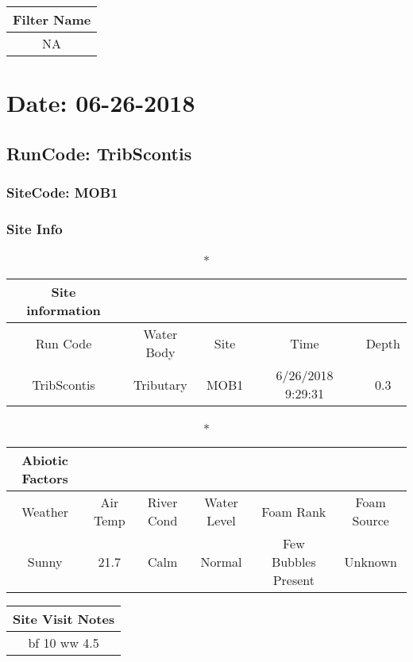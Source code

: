 \documentclass[
  letterpaper,
  DIV=11,
  numbers=noendperiod]{scrartcl}
\begin{document}
\begin{longtable*}{c}
\toprule
Filter Name \\ 
\midrule\addlinespace[2.5pt]
NA \\ 
\bottomrule
\end{longtable*}

\hypertarget{date-06-26-2018-8}{%
\section{Date: 06-26-2018}\label{date-06-26-2018-8}}

\hypertarget{runcode-tribscontis-8}{%
\subsection{RunCode: TribScontis}\label{runcode-tribscontis-8}}

\hypertarget{sitecode-mob1}{%
\subsubsection{SiteCode: MOB1}\label{sitecode-mob1}}

\subsubsection{Site Info}

\begin{longtable*}{ccccc}
\caption*{
{\large Site information}
} \\ 
\toprule
Run Code & Water Body & Site & Time & Depth \\ 
\midrule\addlinespace[2.5pt]
TribScontis & Tributary & MOB1 & 6/26/2018 9:29:31 & 0.3 \\ 
\bottomrule
\end{longtable*}

\begin{longtable*}{cccccc}
\caption*{
{\large Abiotic Factors}
} \\ 
\toprule
Weather & Air Temp & River Cond & Water Level & Foam Rank & Foam Source \\ 
\midrule\addlinespace[2.5pt]
Sunny & 21.7 & Calm & Normal & Few Bubbles Present & Unknown \\ 
\bottomrule
\end{longtable*}

\begin{longtable*}{c}
\toprule
Site Visit Notes \\ 
\midrule\addlinespace[2.5pt]
bf 10
ww 4.5 \\ 
\bottomrule
\end{longtable*}
\end{document}
